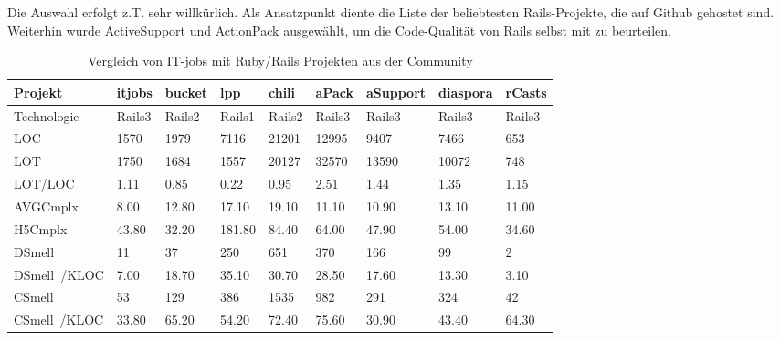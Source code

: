 Die Auswahl erfolgt z.T. sehr willkürlich. Als Ansatzpunkt diente die Liste der beliebtesten Rails-Projekte, die auf Github gehostet sind. Weiterhin wurde ActiveSupport und ActionPack ausgewählt, um die Code-Qualität von Rails selbst mit zu beurteilen.

\begin{table}[hbp]
 \caption{Vergleich von IT-jobs mit Ruby/Rails Projekten aus der Community}\label{table:cmpother}
 \begin{tabular}{|p{1.8cm}|l|l|l|l|l|l|l|l|}
\hline \rowcolor{tableheadcolor}
 Projekt&itjobs&bucket&lpp&chili&aPack&aSupport&diaspora&rCasts\\
\hline
Technologie&Rails3&Rails2&Rails1&Rails2&Rails3&Rails3&Rails3&Rails3\\
\hline
LOC&1570&1979&7116&21201&12995&9407&7466&653\\
\hline
LOT&1750&1684&1557&20127&32570&13590&10072&748\\
\hline
LOT/LOC&1.11&0.85&0.22&0.95&2.51&1.44&1.35&1.15\\
\hline
AVGCmplx&8.00&12.80&17.10&19.10&11.10&10.90&13.10&11.00\\
\hline
H5Cmplx&43.80&32.20&181.80&84.40&64.00&47.90&54.00&34.60\\
\hline
DSmell&11&37&250&651&370&166&99&2\\
\hline
DSmell\newline~/KLOC&7.00&18.70&35.10&30.70&28.50&17.60&13.30&3.10\\
\hline
CSmell&53&129&386&1535&982&291&324&42\\
\hline
CSmell\newline~/KLOC&33.80&65.20&54.20&72.40&75.60&30.90&43.40&64.30\\
\hline
\end{tabular}
\end{table}

